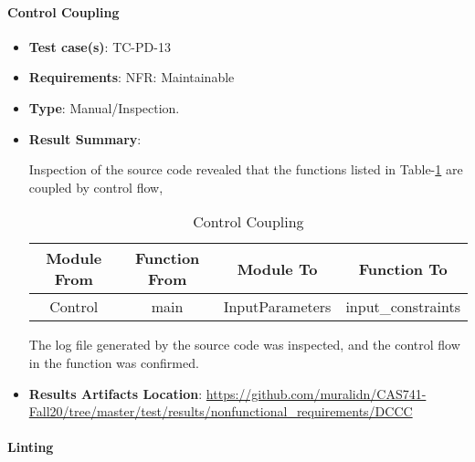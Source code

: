 \documentclass[12pt, titlepage]{article}
\begin{document}
\paragraph{Control Coupling} 

\begin{itemize}

\item \textbf{Test case(s)}: TC-PD-13

\item \textbf{Requirements}: NFR: Maintainable

\item \textbf{Type}: Manual/Inspection.

\item \textbf{Result Summary}: 

Inspection of the source code revealed that the functions listed in Table-\ref{tab:ctrlCoupling}  
are coupled by control flow,

\begin{table}[]
\caption{Control Coupling}
\label{tab:ctrlCoupling}
\begin{tabular}{c|c|c|c}
\multicolumn{1}{c|}{Module From} & \multicolumn{1}{c|}{Function From} & Module To         & Function To     \\ \hline
Control                      & main                           & InputParameters & input\_constraints    \\
\end{tabular}
\end{table}

The log file generated by the source code was inspected, and the control flow in the 
function was confirmed.

\item \textbf{Results Artifacts Location}:  \url{https://github.com/muralidn/CAS741-Fall20/tree/master/test/results/nonfunctional_requirements/DCCC}

\end{itemize}

\paragraph{Linting}
\end{document}
